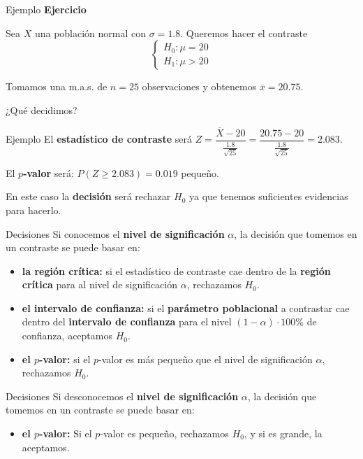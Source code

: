 \documentclass[
  ignorenonframetext,
]{beamer}
\providecommand{\tightlist}{%
  \setlength{\itemsep}{0pt}\setlength{\parskip}{0pt}}
\begin{document}
\begin{frame}{Ejemplo}
\protect\hypertarget{ejemplo-2}{}
\textbf{Ejercicio}

Sea \(X\) una población normal con \(\sigma=1.8\). Queremos hacer el
contraste \[
\left\{\begin{array}{l}
H_0:\mu=20\\ H_1:\mu>20
\end{array}
\right.
\]

Tomamos una m.a.s. de \(n=25\) observaciones y obtenemos
\(\overline{x}=20.75\).

¿Qué decidimos?
\end{frame}

\begin{frame}{Ejemplo}
\protect\hypertarget{ejemplo-3}{}
El \textbf{estadístico de contraste} será
\(Z= \dfrac{\overline{X}-20}{\frac{1.8}{\sqrt{25}}}= \dfrac{20.75-20}{\frac{1.8}{\sqrt{25}}}=2.083.\)

El \textbf{\(p\)-valor} será: \(P(Z\geq 2.083)=0.019\) pequeño.

En este caso la \textbf{decisión} será rechazar \(H_0\) ya que tenemos
suficientes evidencias para hacerlo.
\end{frame}

\begin{frame}{Decisiones}
\protect\hypertarget{decisiones-4}{}
Si conocemos el \textbf{nivel de significación} \(\alpha\), la decisión
que tomemos en un contraste se puede basar en:

\begin{itemize}[<+->]
\item
  \textbf{la región crítica:} si el estadístico de contraste cae dentro
  de la \textbf{región crítica} para al nivel de significación
  \(\alpha\), rechazamos \(H_0\).
\item
  \textbf{el intervalo de confianza:} si el \textbf{parámetro
  poblacional} a contrastar cae dentro del \textbf{intervalo de
  confianza} para el nivel \((1-\alpha)\cdot 100\%\) de confianza,
  aceptamos \(H_0\).
\item
  \textbf{el \(p\)-valor:} si el \(p\)-valor es más pequeño que el nivel
  de significación \(\alpha\), rechazamos \(H_0\).
\end{itemize}
\end{frame}

\begin{frame}{Decisiones}
\protect\hypertarget{decisiones-5}{}
Si desconocemos el \textbf{nivel de significación} \(\alpha\), la
decisión que tomemos en un contraste se puede basar en:

\begin{itemize}[<+->]
\tightlist
\item
  \textbf{el \(p\)-valor:} Si el \(p\)-valor es pequeño, rechazamos
  \(H_0\), y si es grande, la aceptamos.
\end{itemize}
\end{frame}
\end{document}

